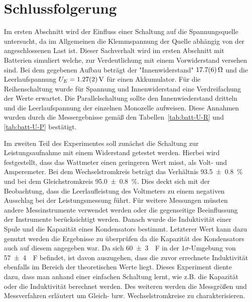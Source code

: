 
\section{Schlussfolgerung}


Im ersten Abschnitt wird der Einfluss einer Schaltung auf die Spannungsquelle untersucht, da im Allgemeinen die Klemmspannung der Quelle abhängig von der angeschlossenen Last ist. Dieser Sachverhalt wird im ersten Abschnitt mit Batterien simuliert welche, zur Verdeutlichung mit einem Vorwiderstand versehen sind. Bei dem gegebenen Aufbau beträgt der "Innenwiderstand" $\SI{17.7+-0.6}{\ohm}$ und die Leerlaufspannung $U_E=\SI{1.27+-0.02}{V}$ für einen Akkumulator. Für die Reihenschaltung wurde für Spannung und Innenwiderstand eine Verdreifachung der Werte erwartet. Die Parallelschaltung sollte den Innenwiederstand dritteln und die Leerlaufspannung der einzelnen Monozelle aufweisen. Diese Annahmen wurden durch die Messergebnisse gemäß den Tabellen~\ref{tab:batt-U-R} und \ref{tab:batt-U-P} bestätigt.

Im zweiten Teil des Experimentes soll zunächst die Schaltung zur Leistungsaufnahme mit einem Widerstand getestet werden. Hierbei wird festgestellt, dass das Wattmeter einen geringeren Wert misst, als Volt- und Amperemeter. Bei dem Wechselstromkreis beträgt das Verhältnis \SI{93.5+-0.8}{\percent} und bei dem Gleichstromkreis \SI{ 95.0+-0.8}{\percent}.
Dies deckt sich mit der Beobachtung, dass die Leerlaufleistung des Voltmeters zu einem negativen Ausschlag bei der Leistungsmessung führt. Für weitere Messungen müssten andere Messinstrumente verwendet werden oder die gegenseitige Beeinflussung der Instrumente berücksichtigt werden.
Danach wurde die Induktivität einer Spule und die Kapazität eines Kondensators bestimmt.
Letzterer Wert kann dazu genutzt werden die Ergebnisse zu überprüfen da die Kapazität des Kondensators auch auf diesem angegeben war.
Da sich \SI{60+-3}{\mu F} in der $1\sigma$-Umgebung von \SI{57+-4}{\mu F} befindet, ist davon auszugehen, dass die zuvor errechnete Induktivität ebenfalls im Bereich der theoretischen Werte liegt.
Dieses Experiment diente dazu, dass man anhand einer einfachen Schaltung lernt, wie z.B. die Kapazität oder die Induktivität berechnet werden. Des weiteren werden die Messgrößen und Messverfahren erläutert um Gleich- bzw. Wechselstromkreise zu charakterisieren.










